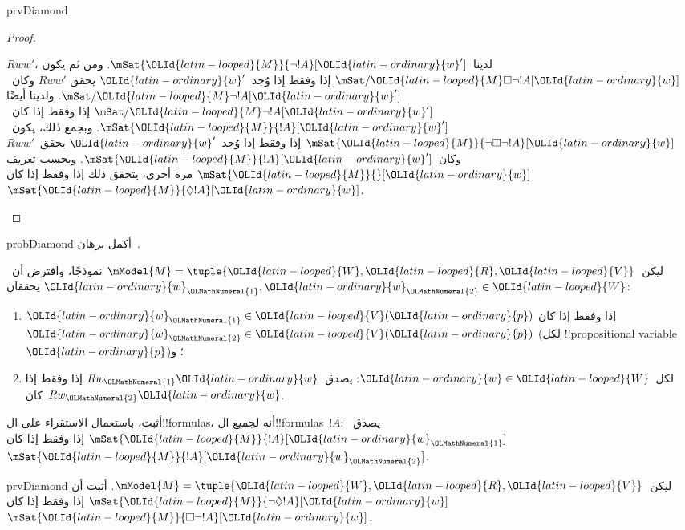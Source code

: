 \documentclass[../../../include/open-logic-section]{subfiles}
\begin{document}
\begin{tagblock}{prvDiamond}
\begin{proof}
\begin{enumerate}
{      $Rww'$، لدينا~$\mSat{\OLId{latin-looped}{M}}{\lnot !A}[\OLId{latin-ordinary}{w}']$. ومن ثم يكون
      $\mSat/{\OLId{latin-looped}{M}}{\Box\lnot !A}[\OLId{latin-ordinary}{w}]$ إذا وفقط إذا وُجد~$\OLId{latin-ordinary}{w}'$ يحقق
      $Rww'$ وكان~$\mSat/{\OLId{latin-looped}{M}}{\lnot !A}[\OLId{latin-ordinary}{w}']$. ولدينا أيضًا
      $\mSat/{\OLId{latin-looped}{M}}{\lnot !A}[\OLId{latin-ordinary}{w}']$ إذا وفقط إذا كان~$\mSat{\OLId{latin-looped}{M}}{!A}[\OLId{latin-ordinary}{w}']$.
      وبجمع ذلك، يكون~$\mSat{\OLId{latin-looped}{M}}{\lnot\Box\lnot !A}[\OLId{latin-ordinary}{w}]$ إذا وفقط إذا
      وُجد~$\OLId{latin-ordinary}{w}'$ يحقق~$Rww'$ وكان~$\mSat{\OLId{latin-looped}{M}}{!A}[\OLId{latin-ordinary}{w}']$. وبحسب تعريف
      $\mSat{\OLId{latin-looped}{M}}{}[\OLId{latin-ordinary}{w}]$ مرة أخرى، يتحقق ذلك إذا وفقط إذا كان
      $\mSat{\OLId{latin-looped}{M}}{\Diamond !A}[\OLId{latin-ordinary}{w}]$.}
  \end{enumerate}
\end{proof}

\begin{probtag}{probDiamond}
  أكمل برهان~.
\end{probtag}
\end{tagblock}

\begin{prob}
  ليكن~$\mModel{M} = \tuple{\OLId{latin-looped}{W}, \OLId{latin-looped}{R}, \OLId{latin-looped}{V}}$ نموذجًا، وافترض أن~$\OLId{latin-ordinary}{w}_\OLMathNumeral{1}, \OLId{latin-ordinary}{w}_\OLMathNumeral{2} \in
  \OLId{latin-looped}{W}$ يحققان:
  \begin{enumerate}
  \item $\OLId{latin-ordinary}{w}_\OLMathNumeral{1} \in \OLId{latin-looped}{V}(\OLId{latin-ordinary}{p})$ إذا وفقط إذا كان~$\OLId{latin-ordinary}{w}_\OLMathNumeral{2} \in \OLId{latin-looped}{V}(\OLId{latin-ordinary}{p})$ (لكل
    !!{propositional variable}~$\OLId{latin-ordinary}{p}$)؛ و
  \item لكل~$\OLId{latin-ordinary}{w} \in \OLId{latin-looped}{W}$: يصدق~$Rw_\OLMathNumeral{1}\OLId{latin-ordinary}{w}$ إذا وفقط إذا كان~$Rw_\OLMathNumeral{2}\OLId{latin-ordinary}{w}$.
  \end{enumerate}
  أثبت، باستعمال الاستقراء على ال!!{formula}s، أنه لجميع
  ال!!{formula}s~$!A$: يصدق~$\mSat{\OLId{latin-looped}{M}}{!A}[\OLId{latin-ordinary}{w}_\OLMathNumeral{1}]$ إذا وفقط إذا كان
  $\mSat{\OLId{latin-looped}{M}}{!A}[\OLId{latin-ordinary}{w}_\OLMathNumeral{2}]$.
\end{prob}

\begin{probtag}{prvDiamond}
  ليكن~$\mModel{M} = \tuple{\OLId{latin-looped}{W}, \OLId{latin-looped}{R}, \OLId{latin-looped}{V}}$. أثبت أن
  $\mSat{\OLId{latin-looped}{M}}{\lnot\Diamond !A}[\OLId{latin-ordinary}{w}]$ إذا وفقط إذا كان
  $\mSat{\OLId{latin-looped}{M}}{\Box\lnot!A}[\OLId{latin-ordinary}{w}]$.
\end{probtag}
\end{document}
